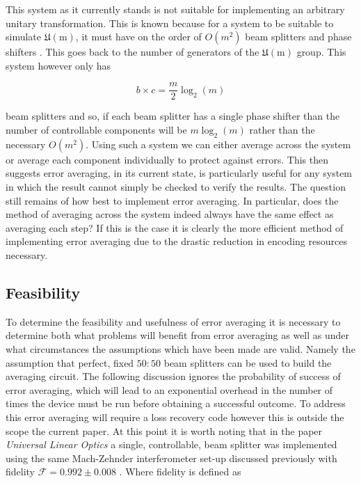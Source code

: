 \documentclass[aps,pra,twocolumn,superscriptaddress,numerical]{revtex4-1}
\begin{document}
		This system as it currently stands is not suitable for implementing an arbitrary unitary transformation. This is known because for a system to be suitable to simulate $\mathfrak{U\mathrm{(m)}}$, it must have on the order of $O\left(m^{2}\right)$ beam splitters and phase shifters \cite{reck}. This goes back to the number of generators of the $\mathfrak{U\mathrm{(m)}}$ group. This system however only has
		
		\begin{equation}
		b\times c=\frac{m}{2}\log_{2}(m)
		\end{equation}
		
		
		beam splitters and so, if each beam splitter has a single phase shifter than the number of controllable components will be $m\log_{2}(m)$ rather than the necessary $O\left(m^{2}\right)$. Using such a system we can either average across the system or average each component individually to protect against errors. This then suggests error averaging, in its current state, is particularly useful for any system in which the result cannot simply be checked to verify the results. The question still remains of how best to implement error averaging. In particular, does the method of averaging across the system indeed always have the same effect as averaging each step? If this is the case it is clearly the more efficient method of implementing error averaging due to the drastic reduction in encoding resources necessary.
		
	\subsection{Feasibility\label{Feasibility subsection}}	
		To determine the feasibility and usefulness of error averaging it is necessary to determine both what problems will benefit from error averaging as well as under what circumstances the assumptions which have been made are valid. Namely the assumption that perfect, fixed $50:50$ beam splitters can be used to build the averaging circuit. The following discussion ignores the probability of success of error averaging, which will lead to an exponential overhead in the number of times the device must be run before obtaining a successful outcome. To address this error averaging will require a loss recovery code \cite{OQC} however this is outside the scope the current paper. At this point it is worth noting that in the paper  \textit{Universal Linear Optics} a single, controllable, beam splitter was implemented using the same Mach-Zehnder interferometer set-up discussed previously with fidelity $\mathcal{F}=0.992\pm0.008$ \cite{ULO}. Where fidelity is defined as 
		
\end{document}
